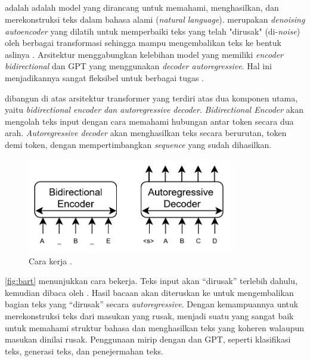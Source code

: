 \subsection{\bartfull}
\label{subsec:bart}

\bartfull adalah adalah model \ml{} yang dirancang untuk memahami, menghasilkan, dan merekonstruksi teks dalam bahasa alami (\emph{natural language}). \bart{} merupakan \emph{denoising autoencoder} yang dilatih untuk memperbaiki teks yang telah "dirusak" (di-\emph{noise}) oleh berbagai transformasi sehingga mampu mengembalikan teks ke bentuk aslinya \parencite{lewis2019bart}. Arsitektur \bart{} menggabungkan kelebihan model \bert{} yang memiliki \emph{encoder bidirectional} dan GPT yang menggunakan \emph{decoder autoregressive}. Hal ini menjadikannya sangat fleksibel untuk berbagai tugas \nlpfull.

\bart{} dibangun di atas arsitektur transformer yang terdiri atas dua 
komponen utama, yaitu \emph{bidirectional encoder dan autoregressive decoder}. 
\emph{Bidirectional Encoder} akan mengolah teks input dengan cara memahami hubungan antar token secara dua arah. \emph{Autoregressive decoder} akan menghasilkan teks secara berurutan, token demi token, dengan mempertimbangkan \emph{sequence} yang sudah dihasilkan.

\pagebreak

\begin{figure}
\centering
\includegraphics[width=0.8\textwidth]{images/bart.png}
\caption{Cara kerja \bart{} \parencite{lewis2019bart}.}
\label{fig:bart}
\end{figure}

\autoref{fig:bart} menunjukkan cara \bart{} bekerja. Teks input akan “dirusak” terlebih dahulu, kemudian dibaca oleh \encoder. Hasil bacaan \encoder{} akan diteruskan ke \decoder{} untuk mengembalikan bagian teks yang “dirusak” secara 
\textit{autoregressive}. Dengan kemampuannya untuk merekonstruksi teks dari masukan yang rusak, \bart{} menjadi suatu \transformer{} yang sangat baik untuk memahami struktur bahasa dan menghasilkan teks yang koheren walaupun masukan dinilai 
rusak. Penggunaan \bart{} mirip dengan \bert{} dan GPT, seperti klasifikasi teks, generasi teks, dan penejermahan teks. 


